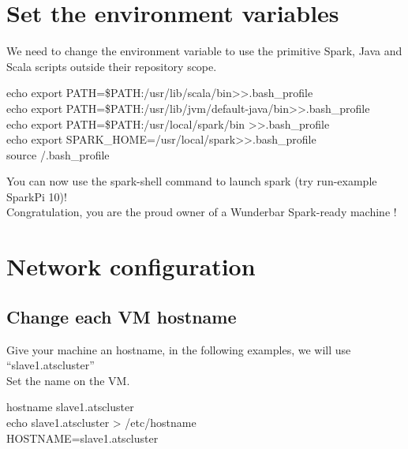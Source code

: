 \documentclass[a4paper]{article}
\begin{document}
\section{Set the environment variables }
We need to change the environment variable to use the primitive Spark, Java and Scala scripts outside their repository scope.
\begin{center}
\begin{tcolorbox}[width=0.8\linewidth,colframe=black!5!white]
echo \textquotesingle export PATH=\$PATH:/usr/lib/scala/bin\textquotesingle \textgreater \textgreater .bash\_profile
\\echo \textquotesingle export PATH=\$PATH:/usr/lib/jvm/default-java/bin\textquotesingle \textgreater \textgreater .bash\_profile
\\echo \textquotesingle export PATH=\$PATH:/usr/local/spark/bin \textquotesingle \textgreater \textgreater .bash\_profile
\\echo \textquotesingle export SPARK\_HOME=/usr/local/spark\textquotesingle \textgreater \textgreater .bash\_profile
\\source \texttildelow/.bash\_profile
\end{tcolorbox}
\end{center}


\noindent You can now use the \colorbox[gray]{0.90}{spark-shell} command to launch spark (try \colorbox[gray]{0.90}{run-example SparkPi 10})!
\\Congratulation, you are the proud owner of a Wunderbar Spark-ready machine  !

\section{Network configuration}

\subsection{Change each VM hostname}
Give your machine an hostname, in the following examples, we will use ``slave1.atscluster''
\\Set the name on the VM.

\begin{center}
\begin{tcolorbox}[width=0.8\linewidth,colframe=black!5!white]
hostname slave1.atscluster
\\echo slave1.atscluster > /etc/hostname
\\HOSTNAME=slave1.atscluster
\end{tcolorbox}
\end{center}
\end{document}
